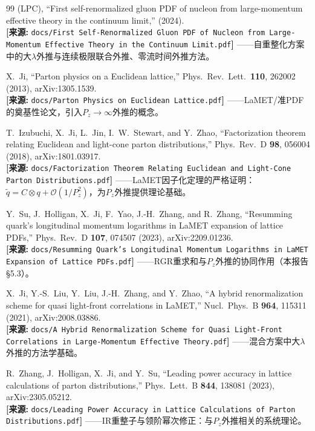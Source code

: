 \documentclass[12pt,a4paper]{ctexart}
\theoremstyle{definition}
\begin{document}
\begin{thebibliography}{99}
(LPC),
``First self-renormalized gluon PDF of nucleon from large-momentum effective theory in the continuum limit,''
(2024).
\\\textbf{[来源:} \texttt{docs/First Self-Renormalized Gluon PDF of Nucleon from Large-Momentum Effective Theory in the Continuum Limit.pdf}\textbf{]}
——自重整化方案中的大$\lambda$外推与连续极限联合外推、零流时间外推方法。

X.~Ji,
``Parton physics on a Euclidean lattice,''
Phys.\ Rev.\ Lett.\ \textbf{110}, 262002 (2013), arXiv:1305.1539.
\\\textbf{[来源:} \texttt{docs/Parton Physics on Euclidean Lattice.pdf}\textbf{]}
——LaMET/准PDF的奠基性论文，引入$P_z\to\infty$外推的概念。

T.~Izubuchi, X.~Ji, L.~Jin, I.~W.~Stewart, and Y.~Zhao,
``Factorization theorem relating Euclidean and light-cone parton distributions,''
Phys.\ Rev.\ D \textbf{98}, 056004 (2018), arXiv:1801.03917.
\\\textbf{[来源:} \texttt{docs/Factorization Theorem Relating Euclidean and Light-Cone Parton Distributions.pdf}\textbf{]}
——LaMET因子化定理的严格证明：$\tilde q = C \otimes q + \mathcal{O}(1/P_z^2)$，为$P_z$外推提供理论基础。

Y.~Su, J.~Holligan, X.~Ji, F.~Yao, J.-H.~Zhang, and R.~Zhang,
``Resumming quark's longitudinal momentum logarithms in LaMET expansion of lattice PDFs,''
Phys.\ Rev.\ D \textbf{107}, 074507 (2023), arXiv:2209.01236.
\\\textbf{[来源:} \texttt{docs/Resumming Quark's Longitudinal Momentum Logarithms in LaMET Expansion of Lattice PDFs.pdf}\textbf{]}
——RGR重求和与$P_z$外推的协同作用（本报告§5.3）。

X.~Ji, Y.-S.~Liu, Y.~Liu, J.-H.~Zhang, and Y.~Zhao,
``A hybrid renormalization scheme for quasi light-front correlations in LaMET,''
Nucl.\ Phys.\ B \textbf{964}, 115311 (2021), arXiv:2008.03886.
\\\textbf{[来源:} \texttt{docs/A Hybrid Renormalization Scheme for Quasi Light-Front Correlations in Large-Momentum Effective Theory.pdf}\textbf{]}
——混合方案中大$\lambda$外推的方法学基础。

R.~Zhang, J.~Holligan, X.~Ji, and Y.~Su,
``Leading power accuracy in lattice calculations of parton distributions,''
Phys.\ Lett.\ B \textbf{844}, 138081 (2023), arXiv:2305.05212.
\\\textbf{[来源:} \texttt{docs/Leading Power Accuracy in Lattice Calculations of Parton Distributions.pdf}\textbf{]}
——IR重整子与领阶幂次修正：与$P_z$外推相关的系统理论。


\end{thebibliography}
\end{document}
